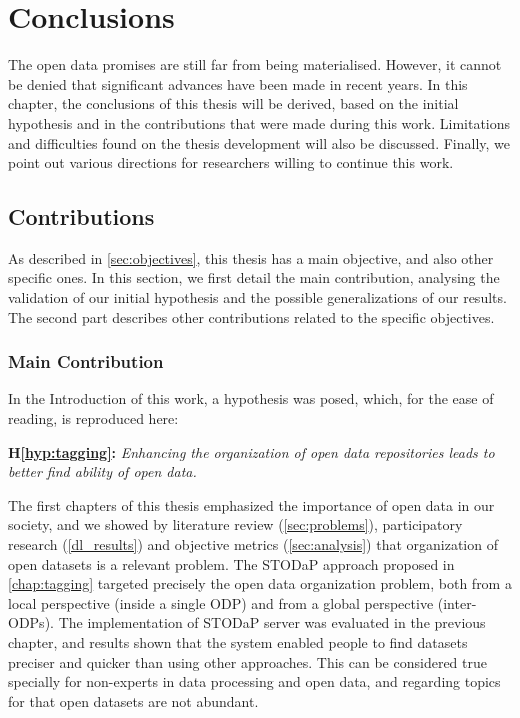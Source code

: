 \chapter{Conclusions}
\label{chap:conclusions}



The open data promises are still far from being materialised.
However, it cannot be denied that significant advances have been made in recent years.
In this chapter, the conclusions of this thesis will be derived, based on the initial hypothesis and in the contributions that were made during this work.
Limitations and difficulties found on the thesis development will also be discussed.
Finally, we point out various directions for researchers willing to continue this work.


\section{Contributions}

As described in \autoref{sec:objectives}, this thesis has a main objective, and also other specific ones.
In this section, we first detail the main contribution, analysing the validation of our initial hypothesis and the possible generalizations of our results.
The second part describes other contributions related to the specific objectives.

\subsection{Main Contribution}
\label{sec:main_contribution}

In the Introduction of this work, a hypothesis was posed, which, for the ease of reading, is reproduced here:

\noindent\textbf{H\ref{hyp:tagging}:} \emph{Enhancing the organization of open data repositories leads to better find ability of open data.}


The first chapters of this thesis emphasized the importance of open data in our society, and we showed by literature review (\autoref{sec:problems}), participatory research (\autoref{dl_results}) and objective metrics (\autoref{sec:analysis}) that organization of open datasets is a relevant problem.
The STODaP approach proposed in \autoref{chap:tagging} targeted precisely the open data organization problem, both from a local perspective (inside a single ODP) and from a global perspective (inter-ODPs).
The implementation of STODaP server was evaluated in the previous chapter, and results shown that the system enabled people to find datasets preciser and quicker than using other approaches.
This can be considered true specially for non-experts in data processing and open data, and regarding topics for that open datasets are not abundant.

